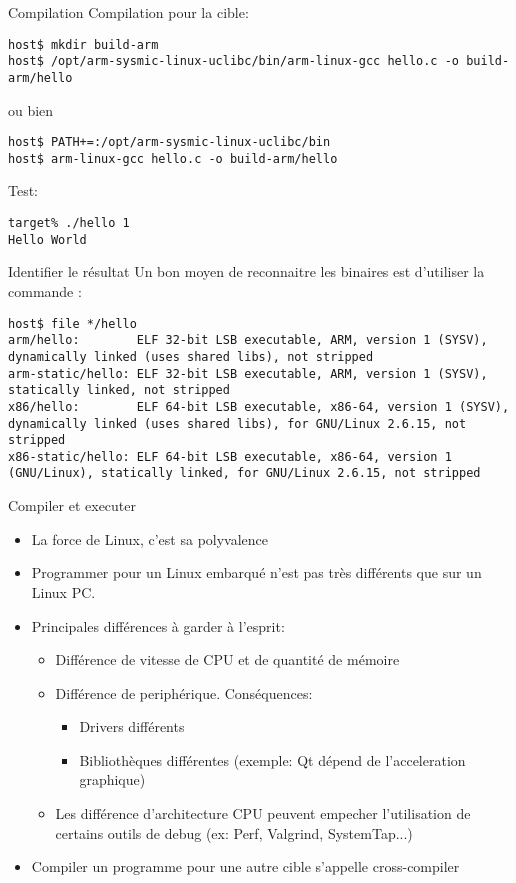 \begin{frame}[fragile=singleslide]{Compilation}
  Compilation pour la cible:
  \begin{lstlisting}
host$ mkdir build-arm
host$ /opt/arm-sysmic-linux-uclibc/bin/arm-linux-gcc hello.c -o build-arm/hello
  \end{lstlisting} 
  ou bien
  \begin{lstlisting} 
host$ PATH+=:/opt/arm-sysmic-linux-uclibc/bin
host$ arm-linux-gcc hello.c -o build-arm/hello
  \end{lstlisting}
  Test:
  \begin{lstlisting} 
target% ./hello 1
Hello World
  \end{lstlisting} %
\end{frame}

\begin{frame}[fragile=singleslide]{Identifier le résultat}
  Un bon moyen de reconnaitre  les binaires est d'utiliser la commande
  :
\begin{lstlisting}
host$ file */hello
arm/hello:        ELF 32-bit LSB executable, ARM, version 1 (SYSV), dynamically linked (uses shared libs), not stripped
arm-static/hello: ELF 32-bit LSB executable, ARM, version 1 (SYSV), statically linked, not stripped
x86/hello:        ELF 64-bit LSB executable, x86-64, version 1 (SYSV), dynamically linked (uses shared libs), for GNU/Linux 2.6.15, not stripped
x86-static/hello: ELF 64-bit LSB executable, x86-64, version 1 (GNU/Linux), statically linked, for GNU/Linux 2.6.15, not stripped
\end{lstlisting} %
\end{frame}

\begin{frame}{Compiler et executer}
  \begin{itemize}
  \item La force de Linux, c'est sa polyvalence
  \item Programmer  pour un Linux  embarqué n'est pas  très différents
    que sur un Linux PC.
  \item Principales différences à garder à l'esprit:
    \begin{itemize}
    \item Différence de vitesse de CPU et de quantité de mémoire
    \item Différence de periphérique. Conséquences:
      \begin{itemize}
      \item Drivers différents
      \item   Bibliothèques   différentes   (exemple:  Qt   dépend   de
        l'acceleration graphique)
      \end{itemize}
    \item   Les  différence   d'architecture   CPU  peuvent   empecher
      l'utilisation de  certains outils de debug  (ex: Perf, Valgrind,
      SystemTap...)
    \end{itemize}
  \item  Compiler   un  programme  pour  une   autre  cible  s'appelle
    cross-compiler
  \end{itemize}
\end{frame}

